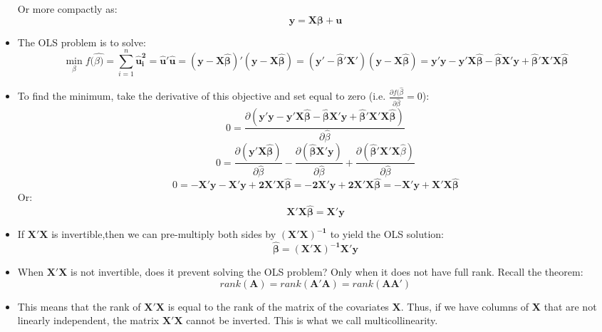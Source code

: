 \documentclass[11pt]{article}
\theoremstyle{definition}
\theoremstyle{remark}
\begin{document}
\begin{itemize}
Or more compactly as:
$$
\mathbf{y = X \beta + u}
$$
\item The OLS problem is to solve:
$$
\min\limits_\beta f(\hat{\beta)} =  \sum_{i=1}^{n} \mathbf{\hat{u}_{i}^{2}} = \mathbf{\hat{u}'\hat{u}} = \mathbf{(y - X\hat{\beta})'(y - X\hat{\beta})} = \mathbf{(y' - \hat{\beta}'X')(y-X\hat{\beta})} = \mathbf{y'y - y'X\hat{\beta} - \hat{\beta}X'y + \hat{\beta}'X'X\hat{\beta}}
$$
\item To find the minimum, take the derivative of this objective and set equal to zero (i.e. $\frac{\partial f(\hat{\beta}}{\partial \hat{\beta}} = 0$):
$$
0 = \frac{\partial(\mathbf{y'y - y'X\hat{\beta} - \hat{\beta}X'y + \hat{\beta}'X'X\hat{\beta}})}{\partial \hat{\beta}}
$$
$$
0 = \frac{\partial(\mathbf{y'X\hat{\beta}})}{\partial \hat{\beta}} - \frac{\partial (\mathbf{\hat{\beta}X'y})}{\partial \hat{\beta}} + \frac{\partial (\mathbf{\hat{\beta}'X'X}\hat{\beta})}{\partial \hat{\beta}}
$$
$$
0 = \mathbf{-X'y - X'y + 2X'X\hat{\beta}} = \mathbf{-2X'y + 2X'X\hat{\beta}} = \mathbf{-X'y + X'X\hat{\beta}}
$$
Or:
$$
\mathbf{X'X\hat{\beta} = X'y}
$$
\item If $\mathbf{X'X}$ is invertible,then we can pre-multiply both sides by $\mathbf{(X'X)^{-1}}$ to yield the OLS solution:
$$
\mathbf{\hat{\beta} = (X'X)^{-1}X'y}
$$
\item When $\mathbf{X'X}$ is not invertible, does it prevent solving the OLS problem? Only when it does not have full rank. Recall the theorem:
$$
rank(\mathbf{A}) = rank(\mathbf{A'A}) = rank(\mathbf{AA'})
$$
\item This means that the rank of $\mathbf{X'X}$  is equal to the rank of the matrix of the covariates $\mathbf{X}$. Thus, if we have columns of \textbf{X} that are not linearly independent, the matrix $\mathbf{X'X}$  cannot be inverted. This is what we call multicollinearity. 
\end{itemize}
\end{document}
